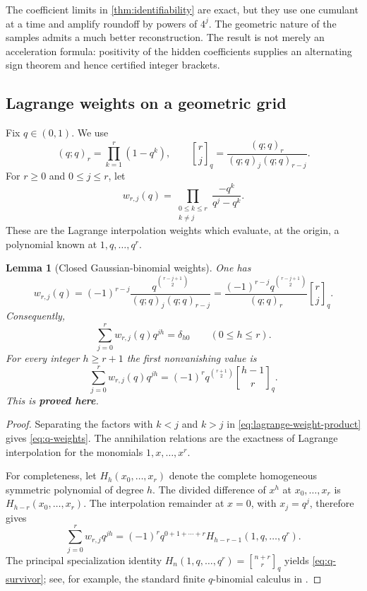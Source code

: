 \documentclass[11pt,oneside]{article}
\numberwithin{equation}{section}
\newtheorem{lemma}[theorem]{Lemma}
\theoremstyle{definition}
\theoremstyle{remark}
\newcommand{\qbinom}[3]{\genfrac{[}{]}{0pt}{}{#1}{#2}_{#3}}
\newcommand{\statusproved}{\textcolor{deepgreen}{\textbf{proved here}}}
\begin{document}
The coefficient limits in \cref{thm:identifiability} are exact, but they use one cumulant at
a time and amplify roundoff by powers of $4^j$.  The geometric nature of the samples admits
a much better reconstruction.  The result is not merely an acceleration formula: positivity
of the hidden coefficients supplies an alternating sign theorem and hence certified integer
brackets.

\subsection{Lagrange weights on a geometric grid}

Fix $q\in(0,1)$.  We use
\[
 (q;q)_r=\prod_{k=1}^{r}(1-q^k),
 \qquad
 \qbinom{r}{j}{q}=\frac{(q;q)_r}{(q;q)_j(q;q)_{r-j}}.
\]
For $r\ge0$ and $0\le j\le r$, let
\begin{equation}
 w_{r,j}(q)
 =\prod_{\substack{0\le k\le r\\k\ne j}}
   \frac{-q^k}{q^j-q^k}.
 \label{eq:lagrange-weight-product}
\end{equation}
These are the Lagrange interpolation weights which evaluate, at the origin, a polynomial
known at $1,q,\ldots,q^r$.

\begin{lemma}[Closed Gaussian-binomial weights]
\label{lem:q-weights}
One has
\begin{equation}
 \boxed{
 w_{r,j}(q)
 =(-1)^{r-j}
   \frac{q^{\binom{r-j+1}{2}}}{(q;q)_j(q;q)_{r-j}}
 =\frac{(-1)^{r-j}q^{\binom{r-j+1}{2}}}{(q;q)_r}
   \qbinom{r}{j}{q}.}
 \label{eq:q-weights}
\end{equation}
Consequently,
\begin{equation}
 \sum_{j=0}^{r}w_{r,j}(q)q^{jh}=\delta_{h0}
 \qquad(0\le h\le r).
 \label{eq:q-annihilation}
\end{equation}
For every integer $h\ge r+1$ the first nonvanishing value is
\begin{equation}
 \boxed{
 \sum_{j=0}^{r}w_{r,j}(q)q^{jh}
 =(-1)^r q^{\binom{r+1}{2}}
   \qbinom{h-1}{r}{q}.}
 \label{eq:q-survivor}
\end{equation}
This is \statusproved.
\end{lemma}

\begin{proof}
Separating the factors with $k<j$ and $k>j$ in
\eqref{eq:lagrange-weight-product} gives \eqref{eq:q-weights}.  The annihilation
relations are the exactness of Lagrange interpolation for the monomials
$1,x,\ldots,x^r$.

For completeness, let
$H_h(x_0,\ldots,x_r)$ denote the complete homogeneous symmetric polynomial of degree $h$.
The divided difference of $x^h$ at $x_0,\ldots,x_r$ is
$H_{h-r}(x_0,\ldots,x_r)$.  The interpolation remainder at $x=0$, with
$x_j=q^j$, therefore gives
\[
 \sum_{j=0}^{r}w_{r,j}q^{jh}
 =(-1)^r q^{0+1+\cdots+r}
   H_{h-r-1}(1,q,\ldots,q^r).
\]
The principal specialization identity
$H_n(1,q,\ldots,q^r)=\qbinom{n+r}{r}{q}$ yields
\eqref{eq:q-survivor}; see, for example, the standard finite $q$-binomial calculus in
\cite{andrews1976}.
\end{proof}
\end{document}
